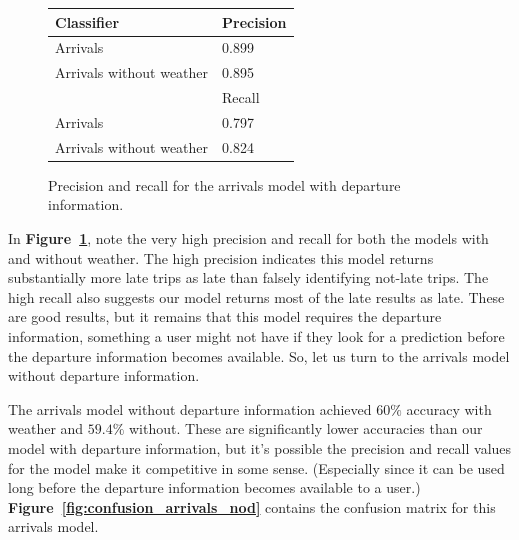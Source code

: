 \documentclass[11pt]{article} %
\begin{document}
\begin{figure}
    \begin{tabular}{l|l}
         Classifier & Precision\\
         \hline
         Arrivals & 0.899\\
         Arrivals without weather & 0.895\\
         \hline
         & Recall\\
         \hline
         Arrivals & 0.797\\
         Arrivals without weather & 0.824\\
    \end{tabular}
    \caption{Precision and recall for the arrivals model with departure 
    information.}
    \label{fig:pr_arrivals}
\end{figure}

In \textbf{Figure~\ref{fig:pr_arrivals}}, note the very high precision and recall 
for both the models with and without weather.  The high precision indicates this
model returns substantially more late trips as late than falsely identifying
not-late trips. The high recall also suggests our model returns most of
the late results as late. These are good results, but it remains that this
model requires the departure information, something a user might not have if they
look for a prediction before the departure information becomes available. So, let
us turn to the arrivals model without departure information.

The arrivals model without departure information achieved $60\%$ accuracy with
weather and $59.4\%$ without.  These are significantly lower accuracies than
our model with departure information, but it's possible the precision and recall
values for the model make it competitive in some sense. (Especially since it can
be used long before the departure information becomes available to a user.)
\textbf{Figure~\ref{fig:confusion_arrivals_nod}} contains the confusion matrix 
for this arrivals model.
\end{document}
